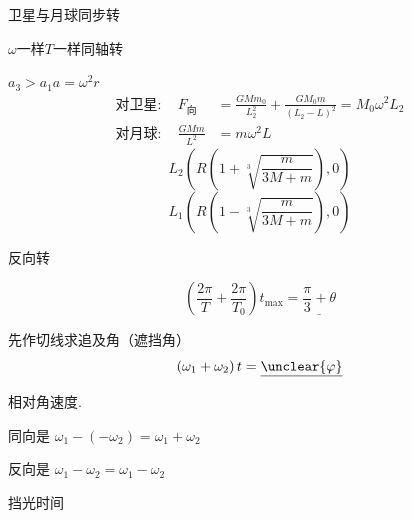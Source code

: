 卫星与月球同步转\quad {} %

$\omega$一样\quad $T$一样\quad 同轴转 %

$a_3>a_1$\qquad $a=\omega^{2}r$
\[
\begin{aligned}
\text{对卫星}:\quad F_{\text{向}}&=\frac{GMm_0}{L_2^{2}}+\frac{GM_0m}{(L_2-L)^{2}}=M_0\omega^{2}L_2\\[8pt]
\text{对月球}:\quad \frac{GMm}{L^{2}}&=m\omega^{2}L
\end{aligned}
\] %
\[ L_2\left(R\left(1+\sqrt[3]{\frac{m}{3M+m}}\right),0\right) \]
\[ L_1\left(R\left(1-\sqrt[3]{\frac{m}{3M+m}}\right),0\right) \] %

反向转

\[ \left(\frac{2\pi}{T}+\frac{2\pi}{T_0}\right)t_{\max}=\underline{\frac{\pi}{3}+\theta} \]

先作切线\quad 求追及角（遮挡角）
\[ (\omega_1+\omega_2)\,t=\underline{\unclear{\varphi}} \]%

相对角速度.

同向是 $\omega_1-(-\omega_2)=\omega_1+\omega_2$%

反向是 $\omega_1-\omega_2=\omega_1-\omega_2$

\quad \red{$2\varphi=2\alpha+2\beta$}

挡光时间 

